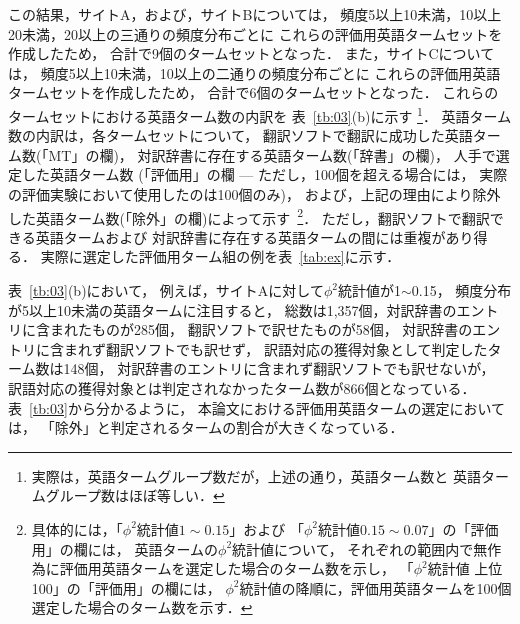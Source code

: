 この結果，サイトA，および，サイトBについては，
頻度5以上10未満，10以上20未満，20以上の三通りの頻度分布ごとに
これらの評価用英語タームセットを作成したため，
合計で9個のタームセットとなった．
また，サイトCについては，
頻度5以上10未満，10以上の二通りの頻度分布ごとに
これらの評価用英語タームセットを作成したため，
合計で6個のタームセットとなった．
これらのタームセットにおける英語ターム数の内訳を
表~\ref{tb:03}(b)に示す
\footnote{
  実際は，英語タームグループ数だが，上述の通り，英語ターム数と
  英語タームグループ数はほぼ等しい．
}．
英語ターム数の内訳は，各タームセットについて，
翻訳ソフトで翻訳に成功した英語ターム数(「MT」の欄)，
対訳辞書に存在する英語ターム数(「辞書」の欄)，
人手で選定した英語ターム数
(「評価用」の欄 --- ただし，100個を超える場合には，
実際の評価実験において使用したのは100個のみ)，
および，上記の理由により除外した英語ターム数(「除外」の欄)によって示す~\footnote{
  具体的には，「$\phi^2統計値 1\sim0.15$」および
  「$\phi^2統計値 0.15\sim0.07$」の「評価用」の欄には，
  英語タームの$\phi^2統計値$について，
  それぞれの範囲内で無作為に評価用英語タームを選定した場合のターム数を示し，
  「$\phi^2$統計値 上位100」の「評価用」の欄には，
  $\phi^2統計値$の降順に，評価用英語タームを100個選定した場合のターム数を示す．
}．
ただし，翻訳ソフトで翻訳できる英語タームおよび
対訳辞書に存在する英語タームの間には重複があり得る．
実際に選定した評価用ターム組の例を表~\ref{tab:ex}に示す．


表~\ref{tb:03}(b)において，
例えば，サイトAに対して$\phi^2$統計値が1$\sim$0.15，
頻度分布が5以上10未満の英語タームに注目すると，
総数は1,357個，対訳辞書のエントリに含まれたものが285個，
翻訳ソフトで訳せたものが58個，
対訳辞書のエントリに含まれず翻訳ソフトでも訳せず，
訳語対応の獲得対象として判定したターム数は148個，
対訳辞書のエントリに含まれず翻訳ソフトでも訳せないが，
訳語対応の獲得対象とは判定されなかったターム数が866個となっている．
表~\ref{tb:03}から分かるように，
本論文における評価用英語タームの選定においては，
「除外」と判定されるタームの割合が大きくなっている．





